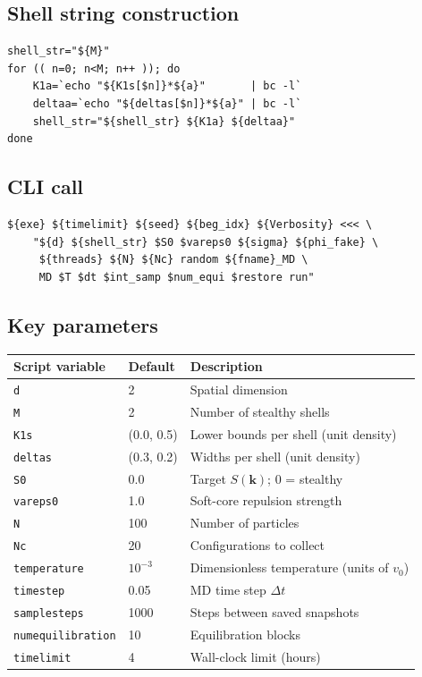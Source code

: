 \documentclass[12pt,a4paper]{article}
\begin{document}
\subsection{Shell string construction}

\begin{lstlisting}[style=bash]
shell_str="${M}"
for (( n=0; n<M; n++ )); do
    K1a=`echo "${K1s[$n]}*${a}"       | bc -l`
    deltaa=`echo "${deltas[$n]}*${a}" | bc -l`
    shell_str="${shell_str} ${K1a} ${deltaa}"
done
\end{lstlisting}

\subsection{CLI call}

\begin{lstlisting}[style=bash]
${exe} ${timelimit} ${seed} ${beg_idx} ${Verbosity} <<< \
    "${d} ${shell_str} $S0 $vareps0 ${sigma} ${phi_fake} \
     ${threads} ${N} ${Nc} random ${fname}_MD \
     MD $T $dt $int_samp $num_equi $restore run"
\end{lstlisting}

\subsection{Key parameters}

\begin{center}
\renewcommand{\arraystretch}{1.4}
\begin{tabular}{lll}
\toprule
Script variable & Default & Description \\
\midrule
\texttt{d} & 2 & Spatial dimension \\
\texttt{M} & 2 & Number of stealthy shells \\
\texttt{K1s} & (0.0, 0.5) & Lower bounds per shell (unit density) \\
\texttt{deltas} & (0.3, 0.2) & Widths per shell (unit density) \\
\texttt{S0} & 0.0 & Target $S(\mathbf{k})$; 0 = stealthy \\
\texttt{vareps0} & 1.0 & Soft-core repulsion strength \\
\texttt{N} & 100 & Number of particles \\
\texttt{Nc} & 20 & Configurations to collect \\
\texttt{temperature} & $10^{-3}$ & Dimensionless temperature (units of $v_0$) \\
\texttt{timestep} & 0.05 & MD time step $\Delta t$ \\
\texttt{samplesteps} & 1000 & Steps between saved snapshots \\
\texttt{numequilibration} & 10 & Equilibration blocks \\
\texttt{timelimit} & 4 & Wall-clock limit (hours) \\
\bottomrule
\end{tabular}
\end{center}
\end{document}
